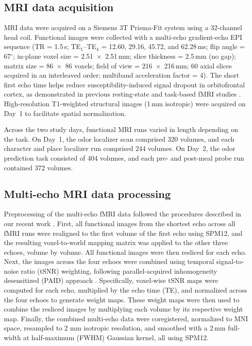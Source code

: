 \documentclass[12pt,letterpaper]{article}
\begin{document}
\subsection*{MRI data acquisition}


MRI data were acquired on a Siemens 3T Prisma-Fit system using a 32-channel head coil. Functional images were collected with a multi-echo gradient-echo EPI sequence (TR = 1.5\,s; TE$_1$--TE$_4$ = 12.60, 29.16, 45.72, and 62.28\,ms; flip angle = 67$^\circ$; in-plane voxel size = 2.51~$\times$~2.51\,mm; slice thickness = 2.5\,mm (no gap); matrix size = 86~$\times$~86 voxels; field of view = 216~$\times$~216\,mm; 60 axial slices acquired in an interleaved order; multiband acceleration factor = 4). The short first echo time helps reduce susceptibility-induced signal dropout in orbitofrontal cortex, as demonstrated in previous resting-state and task-based fMRI studies \cite{RN619,RN524,kirlutpos16,zhao24img}. High-resolution T1-weighted structural images (1\,mm isotropic) were acquired on Day~1 to facilitate spatial normalization.

Across the two study days, functional MRI runs varied in length depending on the task. On Day~1, the odor localizer scan comprised 320 volumes, and each character and place localizer run comprised 244 volumes. On Day~2, the odor prediction task consisted of 404 volumes, and each pre- and post-meal probe run contained 372 volumes.


\subsection*{Multi-echo MRI data processing}


Preprocessing of the multi-echo fMRI data followed the procedures described in our recent work \cite{liu2025distinct}. First, all functional images from the shortest echo across all fMRI runs were realigned to the first volume of the first echo using SPM12, and the resulting voxel-to-world mapping matrix was applied to the other three echoes, volume by volume. All functional images were then resliced for each echo. Next, the images across the four echoes were combined using temporal signal-to-noise ratio (tSNR) weighting, following parallel-acquired inhomogeneity desensitized (PAID) approach \cite{RN524}. Specifically, voxel-wise tSNR maps were computed for each echo, multiplied by the echo time (TE), and normalized across the four echoes to generate weight maps. These weight maps were then used to combine the resliced images by multiplying each volume by its respective weight map. Finally, the combined multi-echo data were coregistered, normalized to MNI space, resampled to 2 mm isotropic resolution, and smoothed with a 2\,mm full-width at half-maximum (FWHM) Gaussian kernel, all using SPM12.
\end{document}
